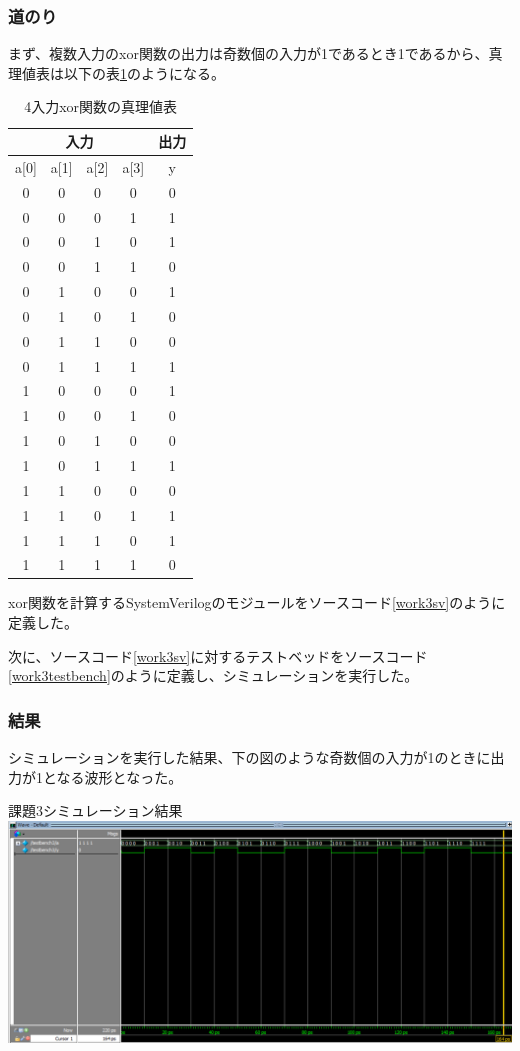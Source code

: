 \documentclass[a4paper]{jarticle}
\begin{document}
\subsubsection{道のり}
まず、複数入力のxor関数の出力は奇数個の入力が1であるとき1であるから、真理値表は以下の表\ref{Work3TruthTable}のようになる。
\begin{table}[ht]
	\begin{center}
		\caption{4入力xor関数の真理値表}
		\label{Work3TruthTable}
		\begin{tabular}{|c|c|c|c||c|}
			\hline
			\multicolumn{4}{|c|}{入力} & \multicolumn{1}{|c|}{出力}\\ \hline\hline
			a[0]	&a[1]	&a[2]	&a[3]	&y\\	\hline\hline
			0	&0	&0	&0	&0\\	\hline
			0	&0	&0	&1	&1\\	\hline
			0	&0	&1	&0	&1\\	\hline
			0	&0	&1	&1	&0\\	\hline
			0	&1	&0	&0	&1\\	\hline
			0	&1	&0	&1	&0\\	\hline
			0	&1	&1	&0	&0\\	\hline
			0	&1	&1	&1	&1\\	\hline
			1	&0	&0	&0	&1\\	\hline
			1	&0	&0	&1	&0\\	\hline
			1	&0	&1	&0	&0\\	\hline
			1	&0	&1	&1	&1\\	\hline
			1	&1	&0	&0	&0\\	\hline
			1	&1	&0	&1	&1\\	\hline
			1	&1	&1	&0	&1\\	\hline
			1	&1	&1	&1	&0\\	\hline
		\end{tabular}
	\end{center}
\end{table}
xor関数を計算するSystemVerilogのモジュールをソースコード\ref{work3sv}のように定義した。

次に、ソースコード\ref{work3sv}に対するテストベッドをソースコード\ref{work3testbench}のように定義し、シミュレーションを実行した。

\subsubsection{結果}
シミュレーションを実行した結果、下の図のような奇数個の入力が1のときに出力が1となる波形となった。
\begin{center}
	課題3シミュレーション結果
	\includegraphics[width=15cm]{3-m.PNG}
\end{center}
\end{document}
